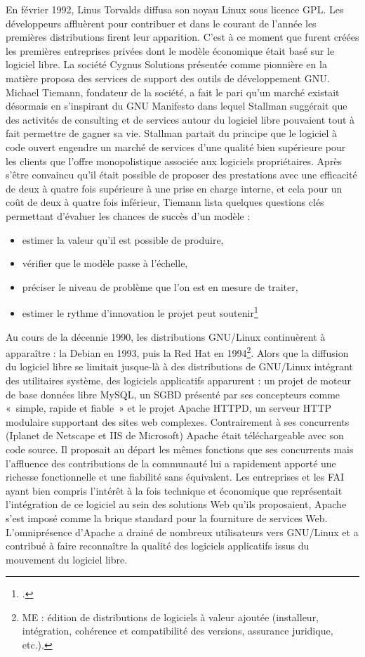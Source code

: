 \documentclass{FramateX}
\begin{document}
\begin{refsection}
En février 1992, Linus Torvalds diffusa son noyau Linux sous licence
GPL. Les développeurs affluèrent pour contribuer et dans le courant de
l'année les premières distributions firent leur apparition. C'est à ce
moment que furent créées les premières entreprises privées dont le
modèle économique était basé sur le logiciel libre. La société Cygnus
Solutions présentée comme pionnière en la matière proposa des services
de support des outils de développement GNU. Michael Tiemann, fondateur
de la société, a fait le pari qu'un marché existait désormais en
s'inspirant du GNU Manifesto dans lequel Stallman suggérait que des
activités de consulting et de services autour du logiciel libre
pouvaient tout à fait permettre de gagner sa vie. Stallman partait du
principe que le logiciel à code ouvert engendre un marché de services
d'une qualité bien supérieure pour les clients que l'offre
monopolistique associée aux logiciels propriétaires. Après s'être
convaincu qu'il était possible de proposer des prestations avec une
efficacité de deux à quatre fois supérieure à une prise en charge
interne, et cela pour un coût de deux à quatre fois inférieur, Tiemann
lista quelques questions clés permettant d'évaluer les chances de
succès d'un modèle : 
\begin{itemize}
	\item estimer la valeur qu'il est possible de produire,
	\item vérifier que le modèle passe à l'échelle,
	\item préciser le niveau de problème que l'on est en mesure de traiter,
	\item estimer le rythme d'innovation le projet peut soutenir\footnote{\cite{tiemannhistory2012}.} 
\end{itemize}

Au cours de la décennie 1990, les distributions GNU/Linux continuèrent à
apparaître : la Debian en 1993, puis la Red Hat en 1994\footnote{ME :
édition de distributions de logiciels à valeur ajoutée (installeur,
intégration, cohérence et compatibilité des versions, assurance
juridique, etc.).}. Alors que la diffusion du logiciel libre se limitait
jusque-là à des distributions de GNU/Linux intégrant des utilitaires
système, des logiciels applicatifs apparurent : un projet de moteur de
base données libre MySQL, un SGBD présenté par ses concepteurs comme
«~simple, rapide et fiable~» et le projet Apache HTTPD, un serveur HTTP
modulaire supportant des sites web complexes. Contrairement à ses
concurrents (Iplanet de Netscape et IIS de Microsoft) Apache était
téléchargeable avec son code source. Il proposait au départ les mêmes
fonctions que ses concurrents mais l'affluence des contributions de la
communauté lui a rapidement apporté une richesse fonctionnelle et une
fiabilité sans équivalent. Les entreprises et les FAI ayant bien
compris l'intérêt à la fois technique et économique que représentait
l'intégration de ce logiciel au sein des solutions Web qu'ils
proposaient, Apache s'est imposé comme la brique standard pour la
fourniture de services Web. L'omniprésence d'Apache a drainé de
nombreux utilisateurs vers GNU/Linux et a contribué à faire reconnaître
la qualité des logiciels applicatifs issus du mouvement du logiciel
libre. 


\end{refsection}
\end{document}
